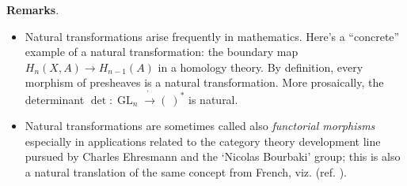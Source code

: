 \documentclass[12pt]{article}
\DeclareMathOperator{\GL}{GL}
\begin{document}


\textbf{Remarks}.  
\begin{itemize}
\item
Natural transformations arise frequently in mathematics.  Here's a ``concrete'' example of a natural transformation: the boundary map $H_n(X,A)\to H_{n-1}(A)$ in a homology theory. By definition, every morphism of presheaves is a natural transformation.
More prosaically, the determinant 
$\det:\GL_n\dot{\to}(\ )^*$
is natural.
\item
Natural transformations are sometimes called also \emph{functorial morphisms} especially in applications related to the category theory development line pursued by Charles Ehresmann and the `Nicolas Bourbaki' group; this is also a natural translation of the same concept from French, viz. (ref. \cite{CE1965}).
\end{itemize}
\end{document}
